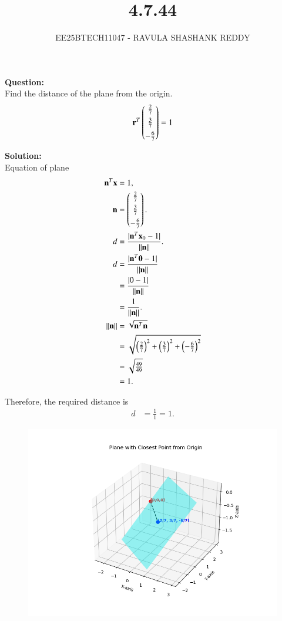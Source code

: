 \documentclass[journal]{article}
\begin{document}
	
	
	\vspace{3cm}
	
\title{4.7.44}
\author{EE25BTECH11047 - RAVULA SHASHANK REDDY}
\maketitle
\hrulefill
\bigskip 

\renewcommand{\thetable}{\theenumi}
\setlength{\intextsep}{10pt}

\textbf{Question:}  \\

Find the distance of the plane from the origin.
\begin{align*}
\mathbf{r}^T\begin{pmatrix}\tfrac{2}{7}\\[4pt]\tfrac{3}{7}\\[4pt]-\tfrac{6}{7}\end{pmatrix} = 1
\end{align*}

\textbf{Solution:} \\ 

Equation of plane
\begin{align}
    \mathbf{n}^T \mathbf{x} &= 1,\\
    \mathbf{n} &= \begin{pmatrix}\tfrac{2}{7}\\[4pt]\tfrac{3}{7}\\[4pt]-\tfrac{6}{7}\end{pmatrix}.\\
    d &= \frac{|\mathbf{n}^T \mathbf{x}_0 - 1|}{\|\mathbf{n}\|}.\\
    d &= \frac{|\mathbf{n}^T \mathbf{0} - 1|}{\|\mathbf{n}\|} \\
      &= \frac{|0 - 1|}{\|\mathbf{n}\|} \\
      &= \frac{1}{\|\mathbf{n}\|}.\\
    \|\mathbf{n}\| &= \sqrt{\mathbf{n}^T \mathbf{n}} \\
    &= \sqrt{\left(\tfrac{2}{7}\right)^2 + \left(\tfrac{3}{7}\right)^2 + \left(-\tfrac{6}{7}\right)^2} \\
    &= \sqrt{\tfrac{49}{49}} \\
    &= 1.
\end{align}

Therefore, the required distance is
\begin{align}
    d &= \frac{1}{1} = \boxed{1}.
\end{align}
\newpage
\begin{figure}
    \centering
    \includegraphics[width=1.0\linewidth]{figs/fig1.png}
    \caption{}
    \label{fig:placeholder}
\end{figure}
\end{document}
